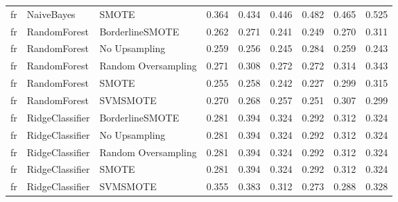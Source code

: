 \begin{tabular}{lllllllll}
      fr &                   NaiveBayes &               SMOTE & 0.364 &                     0.434 &                 0.446 &                  0.482 &                                   0.465 &     0.525 \\
      fr &                 RandomForest &     BorderlineSMOTE & 0.262 &                     0.271 &                 0.241 &                  0.249 &                                   0.270 &     0.311 \\
      fr &                 RandomForest &       No Upsampling & 0.259 &                     0.256 &                 0.245 &                  0.284 &                                   0.259 &     0.243 \\
      fr &                 RandomForest & Random Oversampling & 0.271 &                     0.308 &                 0.272 &                  0.272 &                                   0.314 &     0.343 \\
      fr &                 RandomForest &               SMOTE & 0.255 &                     0.258 &                 0.242 &                  0.227 &                                   0.299 &     0.315 \\
      fr &                 RandomForest &            SVMSMOTE & 0.270 &                     0.268 &                 0.257 &                  0.251 &                                   0.307 &     0.299 \\
      fr &              RidgeClassifier &     BorderlineSMOTE & 0.281 &                     0.394 &                 0.324 &                  0.292 &                                   0.312 &     0.324 \\
      fr &              RidgeClassifier &       No Upsampling & 0.281 &                     0.394 &                 0.324 &                  0.292 &                                   0.312 &     0.324 \\
      fr &              RidgeClassifier & Random Oversampling & 0.281 &                     0.394 &                 0.324 &                  0.292 &                                   0.312 &     0.324 \\
      fr &              RidgeClassifier &               SMOTE & 0.281 &                     0.394 &                 0.324 &                  0.292 &                                   0.312 &     0.324 \\
      fr &              RidgeClassifier &            SVMSMOTE & 0.355 &                     0.383 &                 0.312 &                  0.273 &                                   0.288 &     0.328 \\

\end{tabular}
